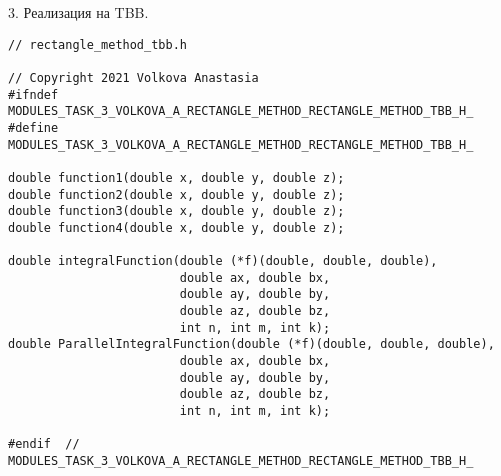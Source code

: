\documentclass{report}
\begin{document}
\par 3. Реализация на TBB.
\begin{lstlisting}
// rectangle_method_tbb.h

// Copyright 2021 Volkova Anastasia
#ifndef MODULES_TASK_3_VOLKOVA_A_RECTANGLE_METHOD_RECTANGLE_METHOD_TBB_H_
#define MODULES_TASK_3_VOLKOVA_A_RECTANGLE_METHOD_RECTANGLE_METHOD_TBB_H_

double function1(double x, double y, double z);
double function2(double x, double y, double z);
double function3(double x, double y, double z);
double function4(double x, double y, double z);

double integralFunction(double (*f)(double, double, double),
                        double ax, double bx,
                        double ay, double by,
                        double az, double bz,
                        int n, int m, int k);
double ParallelIntegralFunction(double (*f)(double, double, double),
                        double ax, double bx,
                        double ay, double by,
                        double az, double bz,
                        int n, int m, int k);

#endif  // MODULES_TASK_3_VOLKOVA_A_RECTANGLE_METHOD_RECTANGLE_METHOD_TBB_H_

\end{lstlisting}
\end{document}
